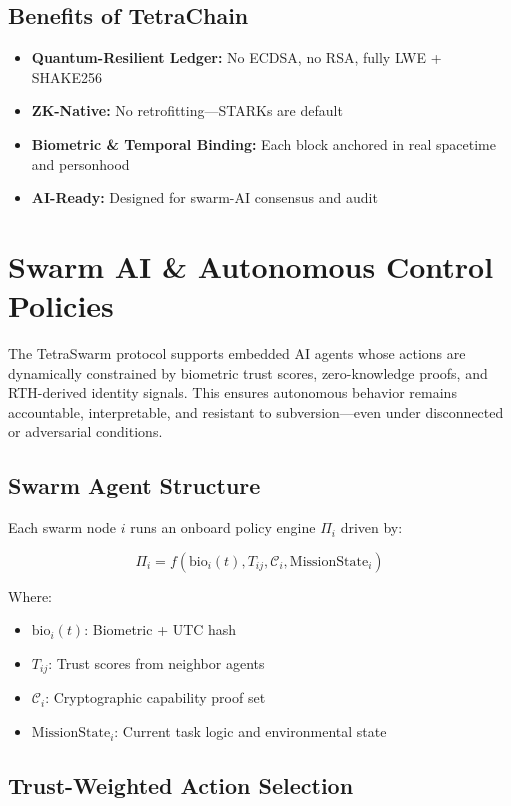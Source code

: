 \documentclass{article}
\begin{document}
\subsection*{Benefits of TetraChain}

\begin{itemize}
    \item \textbf{Quantum-Resilient Ledger:} No ECDSA, no RSA, fully LWE + SHAKE256
    \item \textbf{ZK-Native:} No retrofitting—STARKs are default
    \item \textbf{Biometric & Temporal Binding:} Each block anchored in real spacetime and personhood
    \item \textbf{AI-Ready:} Designed for swarm-AI consensus and audit
\end{itemize}
\section*{Swarm AI \& Autonomous Control Policies}

The TetraSwarm protocol supports embedded AI agents whose actions are dynamically constrained by biometric trust scores, zero-knowledge proofs, and RTH-derived identity signals. This ensures autonomous behavior remains accountable, interpretable, and resistant to subversion—even under disconnected or adversarial conditions.

\subsection*{Swarm Agent Structure}

Each swarm node \( i \) runs an onboard policy engine \( \Pi_i \) driven by:

\[
\Pi_i = f\left(\text{bio}_i(t), T_{ij}, \mathcal{C}_i, \text{MissionState}_i\right)
\]

Where:
\begin{itemize}
    \item \( \text{bio}_i(t) \): Biometric + UTC hash
    \item \( T_{ij} \): Trust scores from neighbor agents
    \item \( \mathcal{C}_i \): Cryptographic capability proof set
    \item \( \text{MissionState}_i \): Current task logic and environmental state
\end{itemize}

\subsection*{Trust-Weighted Action Selection}
\end{document}
